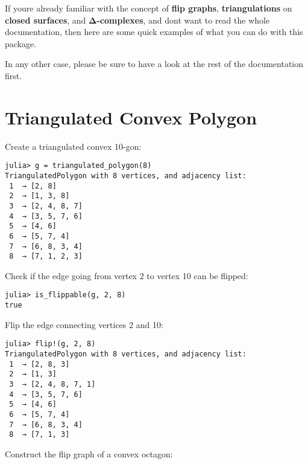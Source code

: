 \label{15530337615267817360}{}




If you{\textquotesingle}re already familiar with the concept of \textbf{flip graphs}, \textbf{triangulations} on \textbf{closed surfaces}, and \textbf{Δ-complexes}, and don{\textquotesingle}t want to read the whole documentation, then here are some quick examples of what you can do with this package.



In any other case, please be sure to have a look at the rest of the documentation first.



\section{Triangulated Convex Polygon}



\label{13164721210504126628}{}


Create a triangulated convex 10-gon:




\begin{verbatim}
julia> g = triangulated_polygon(8)
TriangulatedPolygon with 8 vertices, and adjacency list:
 1  → [2, 8]
 2  → [1, 3, 8]
 3  → [2, 4, 8, 7]
 4  → [3, 5, 7, 6]
 5  → [4, 6]
 6  → [5, 7, 4]
 7  → [6, 8, 3, 4]
 8  → [7, 1, 2, 3]
\end{verbatim}



Check if the edge going from vertex 2 to vertex 10 can be flipped:




\begin{verbatim}
julia> is_flippable(g, 2, 8)
true
\end{verbatim}



Flip the edge connecting vertices 2 and 10:




\begin{verbatim}
julia> flip!(g, 2, 8)
TriangulatedPolygon with 8 vertices, and adjacency list:
 1  → [2, 8, 3]
 2  → [1, 3]
 3  → [2, 4, 8, 7, 1]
 4  → [3, 5, 7, 6]
 5  → [4, 6]
 6  → [5, 7, 4]
 7  → [6, 8, 3, 4]
 8  → [7, 1, 3]
\end{verbatim}



Construct the flip graph of a convex octagon:




